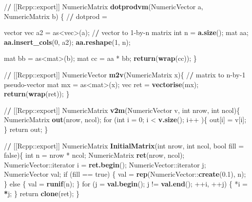 \documentclass[]{article}
\newenvironment{Shaded}{\begin{snugshade}}{\end{snugshade}}
\newcommand{\KeywordTok}[1]{\textcolor[rgb]{0.13,0.29,0.53}{\textbf{{#1}}}}
\newcommand{\DataTypeTok}[1]{\textcolor[rgb]{0.13,0.29,0.53}{{#1}}}
\newcommand{\DecValTok}[1]{\textcolor[rgb]{0.00,0.00,0.81}{{#1}}}
\newcommand{\FloatTok}[1]{\textcolor[rgb]{0.00,0.00,0.81}{{#1}}}
\newcommand{\StringTok}[1]{\textcolor[rgb]{0.31,0.60,0.02}{{#1}}}
\newcommand{\ErrorTok}[1]{\textcolor[rgb]{0.64,0.00,0.00}{\textbf{{#1}}}}
\newcommand{\NormalTok}[1]{{#1}}
\begin{document}
\begin{Shaded}
\begin{Highlighting}[]
{\NormalTok{/}\ErrorTok{/}\StringTok{ }\NormalTok{[[Rcpp::export]]}
\NormalTok{NumericMatrix }\KeywordTok{dotprodvm}\NormalTok{(NumericVector a, NumericMatrix b) \{}
  \NormalTok{/}\ErrorTok{/}\StringTok{ }\NormalTok{dotprod =}\StringTok{ }\NormalTok{vector %
  \NormalTok{vec a2 =}\StringTok{ }\NormalTok{as<vec>(a); /}\ErrorTok{/}\StringTok{ }\NormalTok{vector to }\DecValTok{1}\NormalTok{-by-n matrix}
  \NormalTok{int n =}\StringTok{ }\KeywordTok{a.size}\NormalTok{();}
  \NormalTok{mat aa;}
  \KeywordTok{aa.insert_cols}\NormalTok{(}\DecValTok{0}\NormalTok{, a2);}
  \KeywordTok{aa.reshape}\NormalTok{(}\DecValTok{1}\NormalTok{, n);}

  \NormalTok{mat bb =}\StringTok{ }\NormalTok{as<mat>(b);}
  \NormalTok{mat cc =}\StringTok{ }\NormalTok{aa *}\StringTok{ }\NormalTok{bb;}
  \KeywordTok{return}\NormalTok{(}\KeywordTok{wrap}\NormalTok{(cc));}
\NormalTok{\}}

\NormalTok{/}\ErrorTok{/}\StringTok{ }\NormalTok{[[Rcpp::export]]}
\NormalTok{NumericVector }\KeywordTok{m2v}\NormalTok{(NumericMatrix x)\{}
  \NormalTok{/}\ErrorTok{/}\StringTok{ }\NormalTok{matrix to n-by}\DecValTok{-1} \NormalTok{pseudo-vector}
  \NormalTok{mat mx =}\StringTok{ }\NormalTok{as<mat>(x);}
  \NormalTok{vec ret =}\StringTok{ }\KeywordTok{vectorise}\NormalTok{(mx);}
  \KeywordTok{return}\NormalTok{(}\KeywordTok{wrap}\NormalTok{(ret));}
\NormalTok{\}}

\NormalTok{/}\ErrorTok{/}\StringTok{ }\NormalTok{[[Rcpp::export]]}
\NormalTok{NumericMatrix }\KeywordTok{v2m}\NormalTok{(NumericVector v, int nrow, int ncol)\{}
  \NormalTok{NumericMatrix }\KeywordTok{out}\NormalTok{(nrow, ncol);}
  \NormalTok{for (int }\DataTypeTok{i =} \DecValTok{0}\NormalTok{; i <}\StringTok{ }\KeywordTok{v.size}\NormalTok{(); i++}\StringTok{ }\NormalTok{)\{}
    \NormalTok{out[i] =}\StringTok{ }\NormalTok{v[i];}
  \NormalTok{\}}
  \NormalTok{return out;}
\NormalTok{\}}

\NormalTok{/}\ErrorTok{/}\StringTok{ }\NormalTok{[[Rcpp::export]]}
\NormalTok{NumericMatrix }\KeywordTok{InitialMatrix}\NormalTok{(int nrow, int ncol, bool }\DataTypeTok{fill =} \NormalTok{false)\{}
  \NormalTok{int n =}\StringTok{ }\NormalTok{nrow *}\StringTok{ }\NormalTok{ncol;}
  \NormalTok{NumericMatrix }\KeywordTok{ret}\NormalTok{(nrow, ncol);}
  \NormalTok{NumericVector::iterator i =}\StringTok{ }\KeywordTok{ret.begin}\NormalTok{();}
  \NormalTok{NumericVector::iterator j;}
  \NormalTok{NumericVector val;}
  \NormalTok{if (fill ==}\StringTok{ }\NormalTok{true) \{}
    \NormalTok{val =}\StringTok{ }\KeywordTok{rep}\NormalTok{(NumericVector::}\KeywordTok{create}\NormalTok{(}\FloatTok{0.1}\NormalTok{), n);}
  \NormalTok{\} else \{}
    \NormalTok{val =}\StringTok{ }\KeywordTok{runif}\NormalTok{(n);}
  \NormalTok{\}}
  \NormalTok{for (}\DataTypeTok{j =} \KeywordTok{val.begin}\NormalTok{(); j !=}\StringTok{ }\KeywordTok{val.end}\NormalTok{(); ++i, ++j) \{}
    \NormalTok{*i =}\StringTok{ }\ErrorTok{*}\NormalTok{j;}
  \NormalTok{\}}
  \NormalTok{return }\KeywordTok{clone}\NormalTok{(ret);}
\NormalTok{\}}

}}
\end{Highlighting}
\end{Shaded}
\end{document}
